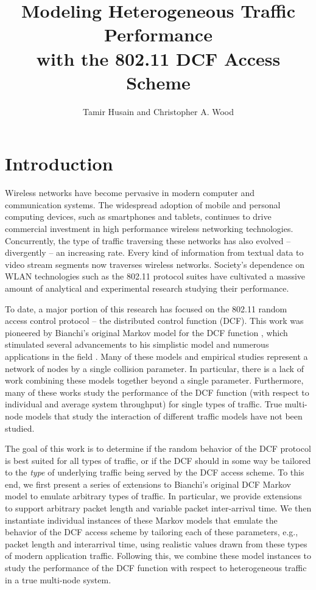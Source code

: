 \documentclass{llncs}
\begin{document}
\mainmatter
\title{Modeling Heterogeneous Traffic Performance \\ with the 802.11 DCF Access Scheme}
\author{Tamir Husain and Christopher A. Wood}
\maketitle

\begin{abstract}
\end{abstract}

\section{Introduction}
Wireless networks have become pervasive in modern computer and communication systems. The widespread adoption of mobile and personal computing devices, such as smartphones and tablets, continues to drive commercial investment in high performance wireless networking technologies. Concurrently, the type of traffic traversing these networks has also evolved -- divergently -- an increasing rate. Every kind of information from textual data to video stream segments now traverses wireless networks. Society's dependence on WLAN technologies such as the 802.11 protocol suites have cultivated a massive amount of analytical and experimental research studying their performance. 

To date, a major portion of this research has focused on the 802.11 random access control protocol -- the distributed control function (DCF). This work was pioneered by Bianchi's original Markov model for the DCF function \cite{bianchi1996performance}, which stimulated several advancements to his simplistic model \cite{bianchi1998ieee} and numerous applications in the field \cite{crow1996performance,chhaya1997performance}. Many of these models and empirical studies represent a network of nodes by a single collision parameter. In particular, there is a lack of work combining these models together beyond a single parameter. Furthermore, many of these works study the performance of the DCF function (with respect to individual and average system throughput) for single types of traffic. True multi-node models that study the interaction of different traffic models have not been studied.

The goal of this work is to determine if the random behavior of the DCF protocol is best suited for all types of traffic, or if the DCF should in some way be tailored to the \emph{type} of underlying traffic being served by the DCF access scheme. To this end, we first present a series of extensions to Bianchi's original DCF Markov model to emulate arbitrary types of traffic. In particular, we provide extensions to support arbitrary packet length and variable packet inter-arrival time. We then instantiate individual instances of these Markov models that emulate the behavior of the DCF access scheme by tailoring each of these parameters, e.g., packet length and interarrival time, using realistic values drawn from these types of modern application traffic. Following this, we combine these model instances to study the performance of the DCF function with respect to heterogeneous traffic in a true multi-node system. 
\end{document}
